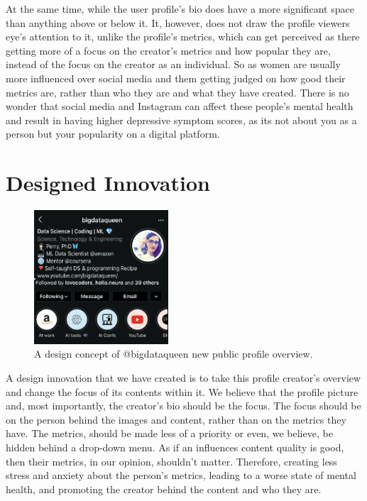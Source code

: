 \documentclass{sigchi}
\begin{document}
	At the same time, while the user profile's bio does have a more significant space than anything above or below it. It, however, does not draw the profile viewers eye's attention to it, unlike the profile's metrics, which can get perceived as there getting more of a focus on the creator's metrics and how popular they are, instead of the focus on the creator as an individual. So as women are usually more influenced over social media and them getting judged on how good their metrics are, rather than who they are and what they have created. There is no wonder that social media and Instagram can affect these people's mental health and result in having higher depressive symptom scores, as its not about you as a person but your popularity on a digital platform.

\section{Designed Innovation}

\begin{figure}
	\begin{center}
		\includegraphics[width=5cm]{instagram_example2.jpg}
		\caption{A design concept of @bigdataqueen new public profile overview.}
		\label{fig:instagram_new_overview}
	\end{center}
\end{figure}

	A design innovation that we have created is to take this profile creator's overview and change the focus of its contents within it. We believe that the profile picture and, most importantly, the creator's bio should be the focus. The focus should be on the person behind the images and content, rather than on the metrics they have. The metrics, should be made less of a priority or even, we believe, be hidden behind a drop-down menu. As if an influences content quality is good, then their metrics, in our opinion, shouldn't matter. Therefore, creating less stress and anxiety about the person's metrics, leading to a worse state of mental health, and promoting the creator behind the content and who they are.
	
\end{document}

